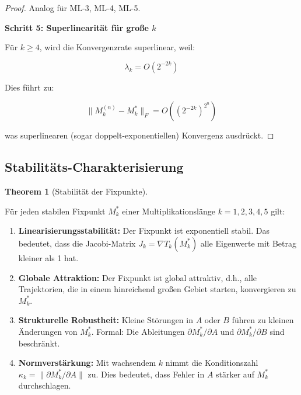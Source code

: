 \documentclass[a4paper,12pt]{article}
\theoremstyle{definition}
\newtheorem{theorem}{Theorem}
\begin{document}
\begin{proof}
Analog für ML-3, ML-4, ML-5.

\textbf{Schritt 5: Superlinearität für große $k$}

Für $k \geq 4$, wird die Konvergenzrate superlinear, weil:

\begin{equation}
\lambda_k = O(2^{-2k})
\end{equation}

Dies führt zu:

\begin{equation}
\|M_k^{(n)} - M_k^*\|_F = O((2^{-2k})^{2^n})
\end{equation}

was superlinearen (sogar doppelt-exponentiellen) Konvergenz ausdrückt.

\end{proof}

\subsection{Stabilitäts-Charakterisierung}

\begin{theorem}[Stabilität der Fixpunkte]
\label{thm:stabilität_fixpunkte}

Für jeden stabilen Fixpunkt $M_k^*$ einer Multiplikationslänge $k = 1, 2, 3, 4, 5$ gilt:

\begin{enumerate}

\item \textbf{Linearisierungsstabilität:} Der Fixpunkt ist exponentiell stabil. Das bedeutet, dass die Jacobi-Matrix $J_k = \nabla T_k(M_k^*)$ alle Eigenwerte mit Betrag kleiner als 1 hat.

\item \textbf{Globale Attraktion:} Der Fixpunkt ist global attraktiv, d.h., alle Trajektorien, die in einem hinreichend großen Gebiet starten, konvergieren zu $M_k^*$.

\item \textbf{Strukturelle Robustheit:} Kleine Störungen in $A$ oder $B$ führen zu kleinen Änderungen von $M_k^*$. Formal: Die Ableitungen $\partial M_k^* / \partial A$ und $\partial M_k^* / \partial B$ sind beschränkt.

\item \textbf{Normverstärkung:} Mit wachsendem $k$ nimmt die Konditionszahl $\kappa_k = \|\partial M_k^* / \partial A\|$ zu. Dies bedeutet, dass Fehler in $A$ stärker auf $M_k^*$ durchschlagen.

\end{enumerate}

\end{theorem}
\end{document}
